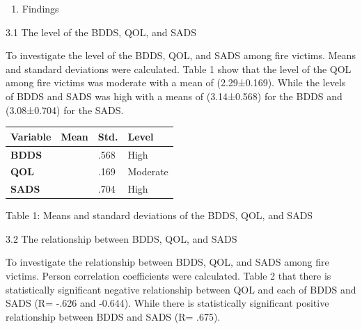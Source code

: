 \documentclass[10pt]{NSP1}
\makeatletter
\newcommand\jltx@wideopen{\par\addvspace{\medskipamount}\noindent}
\newcommand\jltx@wideclose{\par\addvspace{\medskipamount}}
\newenvironment{jltxspan}
  {\if@twocolumn\let\jltx@spannext\strip\else\let\jltx@spannext\jltx@wideopen\fi\jltx@spannext}
  {\if@twocolumn\let\jltx@spanend\endstrip\else\let\jltx@spanend\jltx@wideclose\fi\jltx@spanend}
\newcommand\JLTXaboveplacement{\par\addvspace{6pt plus 2pt minus 2pt}\noindent}
\newcommand\JLTXbelowplacement{\par\addvspace{6pt plus 2pt minus 2pt}}
\makeatother
\begin{document}
\begin{enumerate}
  \item Findings
\end{enumerate}

3.1 The level of the BDDS, QOL, and SADS

To investigate the level of the BDDS, QOL, and SADS among fire victims. Means and standard deviations were calculated. Table 1 show that the level of the QOL among fire victims was moderate with a mean of (2.29±0.169). While the levels of BDDS and SADS was high with a means of (3.14±0.568) for the BDDS and (3.08±0.704) for the SADS.

\JLTXaboveplacement \begin{jltxspan}%
\noindent\begin{minipage}{\linewidth}%
\centering
{\small
\begin{tabular}{|>{\centering\arraybackslash}p{}|>{\centering\arraybackslash}p{}|>{\centering\arraybackslash}p{}|>{\centering\arraybackslash}p{}|}
\hline
\cellcolor[HTML]{DDD9C3}\textbf{Variable} & \cellcolor[HTML]{DDD9C3}\textbf{Mean} & \cellcolor[HTML]{DDD9C3}\textbf{Std.} & \cellcolor[HTML]{DDD9C3}\textbf{Level} \\
\hline
\cellcolor[HTML]{DDD9C3}\textbf{BDDS} & 3.14 & .568 & High \\
\hline
\cellcolor[HTML]{DDD9C3}\textbf{QOL} & 2.29 & .169 & Moderate \\
\hline
\cellcolor[HTML]{DDD9C3}\textbf{SADS} & 3.08 & .704 & High \\
\hline
\end{tabular}}
%
\end{minipage}%
\end{jltxspan}\JLTXbelowplacement 

Table 1: Means and standard deviations of the BDDS, QOL, and SADS

3.2 The relationship between BDDS, QOL, and SADS

To investigate the relationship between BDDS, QOL, and SADS among fire victims. Person correlation coefficients were calculated. Table 2 that there is statistically significant negative relationship between QOL and each of BDDS and SADS (R= -.626 and -0.644). While there is statistically significant positive relationship between BDDS and SADS (R= .675).
\end{document}
